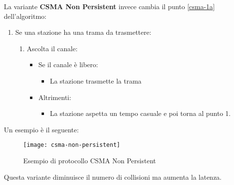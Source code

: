 \documentclass[a4paper]{article}
\begin{document}
\vspace{1em}
\noindent
La variante \textbf{CSMA Non Persistent} invece cambia il punto \ref{csma-1a} dell'algoritmo:
\begin{enumerate}
  \item Se una stazione ha una trama da trasmettere:
  \begin{enumerate}
    \item Ascolta il canale:
      \begin{itemize}
        \item Se il canale è libero:
          \begin{itemize}
            \item La stazione trasmette la trama
          \end{itemize}

        \item Altrimenti:
          \begin{itemize}
            \item La stazione aspetta un tempo casuale e poi torna al punto 1.
          \end{itemize}
      \end{itemize}
  \end{enumerate}
\end{enumerate}

\begin{example}
  Un esempio è il seguente:
  \begin{figure}[H]
    \centering
    \texttt{[image: csma-non-persistent]}
    \caption{Esempio di protocollo CSMA Non Persistent}
  \end{figure}
\end{example}
Questa variante diminuisce il numero di collisioni ma aumenta la latenza.
\end{document}
